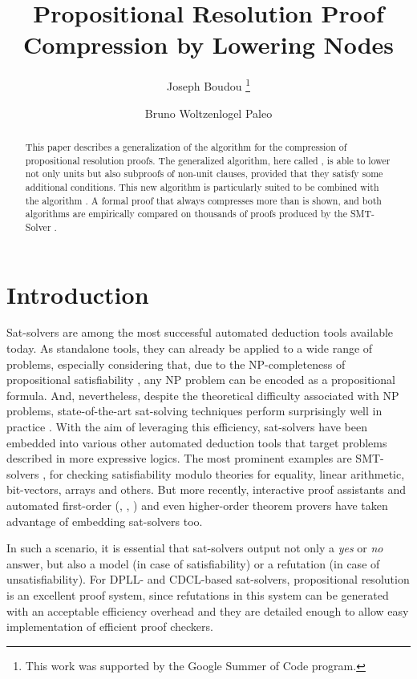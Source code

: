 \documentclass{llncs}
\title{Propositional Resolution Proof Compression by Lowering Nodes}
\author{
  Joseph Boudou\inst{1}
  \thanks{This work was supported by the Google Summer of Code program.}
  \and 
  Bruno Woltzenlogel Paleo\inst{2}
}
\institute{
  Universit\'e Paul Sabatier, Toulouse \\
  \email{joseph.boudou@matabio.net}
  \and 
  Vienna University of Technology \\
  \email{bruno@logic.at}
}
\begin{document}
\maketitle


\begin{abstract}
This paper describes a generalization of the {\LowerUnits} algorithm \cite{LURPI} for the
compression of propositional resolution proofs.  The generalized algorithm, here called
{\LowerUnivalents}, is able to lower not only units but also subproofs of non-unit
clauses, provided that they satisfy some additional conditions. 
This new algorithm is particularly suited to be combined with the {\RecyclePivotsIntersection} algorithm \cite{LURPI}.
A formal proof that
{\LowerUnivalents} always compresses more than {\LowerUnits} is shown, and both algorithms are
empirically compared on thousands of proofs produced by the SMT-Solver \veriT.
\end{abstract}



\section{Introduction}

Sat-solvers are among the most successful automated deduction tools available today. As standalone
tools, they can already be applied to a wide range of problems, especially considering that, due to
the NP-completeness of propositional satisfiability \cite{cook}, any NP problem can be encoded as a
propositional formula. And, nevertheless, despite the theoretical difficulty associated with NP
problems, state-of-the-art sat-solving techniques perform surprisingly well in practice
\cite{sat-competition}. With the aim of leveraging this efficiency, sat-solvers have been embedded
into various other automated deduction tools that target problems described in more expressive
logics. The most prominent examples are SMT-solvers \cite{veriT}, for checking satisfiability modulo
theories for equality, linear arithmetic, bit-vectors, arrays and others. But more recently,
interactive proof assistants \cite{isabelle-blanchette-boehme} and automated first-order
(\cite{spassT}, \cite{iProver}, \cite{Vampire}) and even higher-order \cite{satallax} theorem provers have
taken advantage of embedding sat-solvers too.

In such a scenario, it is essential that sat-solvers output not only a \emph{yes} or \emph{no}
answer, but also a model (in case of satisfiability) or a refutation (in case of unsatisfiability).
For DPLL- and CDCL-based sat-solvers, propositional resolution is an excellent proof system, since
refutations in this system can be generated with an acceptable efficiency overhead and they are
detailed enough to allow easy implementation of efficient proof checkers.
\end{document}
